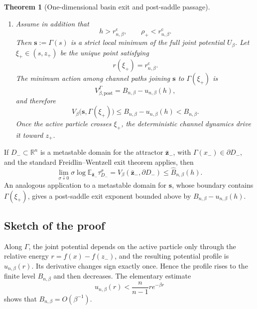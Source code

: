 \documentclass{article}
\theoremstyle{plain}
\newtheorem{theorem}{Theorem}[section]
\theoremstyle{definition}
\theoremstyle{remark}
\begin{document}
\begin{theorem}[One-dimensional basin exit and post-saddle passage]
\begin{enumerate}
    \item Assume in addition that
    \begin{equation}
        h>r_{n,\beta}^{\mathrm c},
        \qquad
        \rho_+<r_{n,\beta}^{\mathrm c}.
        \label{eq:high-barrier-regime}
    \end{equation}
    Then \(\mathbf s:=\Gamma(s)\) is a strict local minimum of the full joint potential \(U_\beta\). Let \(\xi_+\in(s,z_+)\) be the unique point satisfying
    \[
        r(\xi_+)=r_{n,\beta}^{\mathrm c}.
    \]
    The minimum action among channel paths joining \(\mathbf s\) to \(\Gamma(\xi_+)\) is
    \begin{equation}
        V_{\beta,\mathrm{post}}^\Gamma
        =
        B_{n,\beta}-u_{n,\beta}(h),
        \label{eq:post-saddle-channel-action}
    \end{equation}
    and therefore
    \begin{equation}
        V_\beta\bigl(\mathbf s,\Gamma(\xi_+)\bigr)
        \le
        B_{n,\beta}-u_{n,\beta}(h)
        <
        B_{n,\beta}.
        \label{eq:post-saddle-quasipotential-bound}
    \end{equation}
    Once the active particle crosses \(\xi_+\), the deterministic channel dynamics drive it toward \(z_+\).
\end{enumerate}
\end{theorem}

If \(D_-\subset\mathbb R^n\) is a metastable domain for the attractor \(\bar{\mathbf z}_-\), with \(\Gamma(x_-)\in\partial D_-\), and the standard Freidlin--Wentzell exit theorem applies, then
\begin{equation}
    \lim_{\sigma\downarrow0}
    \sigma\log
    \mathbb E_{\bar{\mathbf z}_-}\tau_{D_-}^\sigma
    =
    V_\beta(\bar{\mathbf z}_-,\partial D_-)
    \le
    \widehat B_{n,\beta}(h).
    \label{eq:initial-exit-time-bound}
\end{equation}
An analogous application to a metastable domain for \(\mathbf s\), whose boundary contains \(\Gamma(\xi_+)\), gives a post-saddle exit exponent bounded above by
\(B_{n,\beta}-u_{n,\beta}(h)\).

\subsection{Sketch of the proof}

Along \(\Gamma\), the joint potential depends on the active particle only through the relative energy \(r=f(x)-f(z_-)\), and the resulting potential profile is \(u_{n,\beta}(r)\). Its derivative changes sign exactly once. Hence the profile rises to the finite level \(B_{n,\beta}\) and then decreases. The elementary estimate
\[
    u_{n,\beta}(r)
    <
    \frac{n}{n-1}r e^{-\beta r}
\]
shows that \(B_{n,\beta}=O(\beta^{-1})\).
\end{document}
